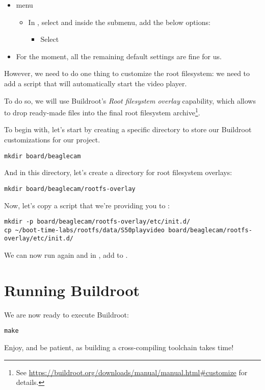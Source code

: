 \begin{itemize}
\item {} menu
  \begin{itemize}
  \item In , select  and
  inside the  submenu, add the below options:
     \begin{itemize}
     \item Select 
     \end{itemize}
  \end{itemize}

\item For the moment, all the remaining default settings are fine for us.
\end{itemize}

However, we need to do one thing to customize the root filesystem: we
need to add a script that will automatically start the 
video player.

To do so, we will use Buildroot's {\em Root filesystem overlay}
capability, which allows to drop ready-made files into the final root
filesystem archive\footnote{See
\url{https://buildroot.org/downloads/manual/manual.html\#customize} for
details.}.

To begin with, let's start by creating a specific directory to store our
Buildroot customizations for our project.

\begin{verbatim}
mkdir board/beaglecam
\end{verbatim}

And in this directory, let's create a directory for root filesystem
overlays:

\begin{verbatim}
mkdir board/beaglecam/rootfs-overlay
\end{verbatim}

Now, let's copy a script that we're providing you to :

\begin{verbatim}
mkdir -p board/beaglecam/rootfs-overlay/etc/init.d/
cp ~/boot-time-labs/rootfs/data/S50playvideo board/beaglecam/rootfs-overlay/etc/init.d/
\end{verbatim}

We can now run  again and in , add  to
.

\section{Running Buildroot}

We are now ready to execute Buildroot:

\begin{verbatim}
make
\end{verbatim}

Enjoy, and be patient, as building a cross-compiling toolchain takes
time!

